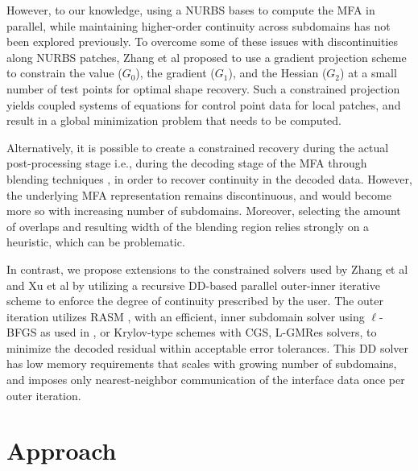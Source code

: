 \documentclass[conference]{IEEEtran}
\begin{document}
However, to our knowledge, using a NURBS bases to compute the MFA in parallel, while maintaining higher-order continuity across subdomains has not been explored previously. 
To overcome some of these issues with discontinuities along NURBS patches, Zhang et al \cite{zhang-nurbs-continuity} proposed to use a gradient projection scheme to constrain the value ($G_0$), the gradient ($G_1$), and the Hessian ($G_2$) at a small number of test points for optimal shape recovery. Such a constrained projection yields coupled systems of equations for control point data for local patches, and result in a global minimization problem that needs to be computed.

Alternatively, it is possible to create a constrained recovery during the actual post-processing stage i.e., during the decoding stage of the MFA through blending techniques \cite{grindeanu-blending}, in order to recover continuity in the decoded data. However, the underlying MFA representation remains discontinuous, and would become more so with increasing number of subdomains. Moreover, selecting the amount of overlaps and resulting width of the blending region relies strongly on a heuristic, which can be problematic.

In contrast, we propose extensions to the constrained solvers used by Zhang et al \cite{zhang-nurbs-continuity} and Xu et al \cite{xu-jahn-discrete-adjoint} by utilizing a recursive DD-based parallel outer-inner iterative scheme to enforce the degree of continuity prescribed by the user. The outer iteration utilizes RASM \cite{gander-rasm}, with an efficient, inner subdomain solver using $\ell$-BFGS as used in \cite{zheng-bo-bspline-bfgs}, or Krylov-type schemes with CGS, L-GMRes solvers, to minimize the decoded residual within acceptable error tolerances. This DD solver has low memory requirements that scales with growing number of subdomains, and imposes only nearest-neighbor communication of the interface data once per outer iteration. 

\section{Approach}
\end{document}

